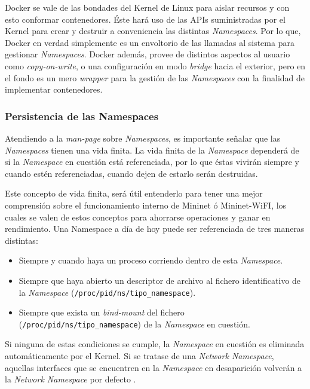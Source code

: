 Docker se vale de las bondades del Kernel de Linux para aislar recursos y con esto conformar contenedores. Éste hará uso de las APIs suministradas por el Kernel para crear y destruir a conveniencia las distintas \textit{Namespaces}. Por lo que, Docker en verdad simplemente es un envoltorio de las llamadas al sistema para gestionar \textit{Namespaces}. Docker además, provee de distintos aspectos al usuario como \textit{copy-on-write}, o una configuración en modo \textit{bridge} hacia el exterior, pero en el fondo es
un mero \textit{wrapper} para la gestión de las \textit{Namespaces} con la finalidad de implementar contenedores.



\subsubsection{Persistencia de las Namespaces}

Atendiendo a la \textit{man-page} \cite{ns} sobre \textit{Namespaces}, es importante señalar que las \textit{Namespaces} tienen una vida finita. La vida finita de la \textit{Namespace} dependerá de si la \textit{Namespace} en cuestión está referenciada, por lo que éstas vivirán siempre y cuando estén referenciadas, cuando dejen de estarlo serán destruidas.\\
\par
Este concepto de vida finita, será útil entenderlo para tener una mejor comprensión sobre el funcionamiento interno de Mininet ó Mininet-WiFI, los cuales se valen de estos conceptos para ahorrarse operaciones y ganar en rendimiento.  Una Namespace a día de hoy puede ser referenciada de tres maneras distintas:\\

\begin{itemize}
    \item Siempre y cuando haya un proceso corriendo dentro de esta \textit{Namespace}.
    \item Siempre que haya abierto un descriptor de archivo al fichero identificativo de la \textit{Namespace} (\texttt{/proc/{pid}/ns/{tipo\_namespace}}).
    \item Siempre que exista un \textit{bind-mount} del fichero (\texttt{/proc/{pid}/ns/{tipo\_namespace}}) de la \textit{Namespace} en cuestión.
\end{itemize}

Si ninguna de estas condiciones se cumple, la \textit{Namespace} en cuestión es eliminada automáticamente por el Kernel. Si se tratase de una \textit{Network Namespace}, aquellas interfaces que se encuentren en la \textit{Namespace} en desaparición volverán a la \textit{Network Namespace} por defecto \cite{ns}.

